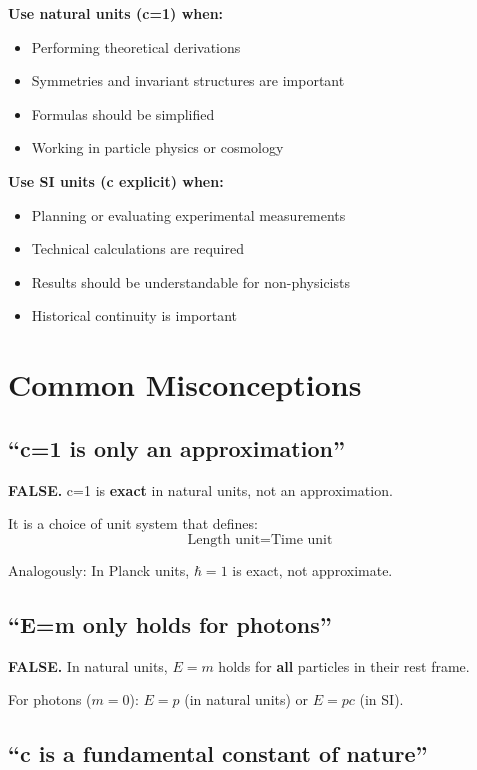 	\textbf{Use natural units (c=1) when:}
	\begin{itemize}
		\item Performing theoretical derivations
		\item Symmetries and invariant structures are important
		\item Formulas should be simplified
		\item Working in particle physics or cosmology
	\end{itemize}
	
	\textbf{Use SI units (c explicit) when:}
	\begin{itemize}
		\item Planning or evaluating experimental measurements
		\item Technical calculations are required
		\item Results should be understandable for non-physicists
		\item Historical continuity is important
	\end{itemize}
	
	\section{Common Misconceptions}
	
	\subsection{``c=1 is only an approximation''}
	
	\textbf{FALSE.} c=1 is \textbf{exact} in natural units, not an approximation.
	
	It is a choice of unit system that defines:
	\begin{equation}
		\text{Length unit} = \text{Time unit}
	\end{equation}
	
	Analogously: In Planck units, $\hbar=1$ is exact, not approximate.
	
	\subsection{``E=m only holds for photons''}
	
	\textbf{FALSE.} In natural units, $E=m$ holds for \textbf{all} particles in their rest frame.
	
	For photons ($m=0$): $E = p$ (in natural units) or $E = pc$ (in SI).
	
	\subsection{``c is a fundamental constant of nature''}
	
